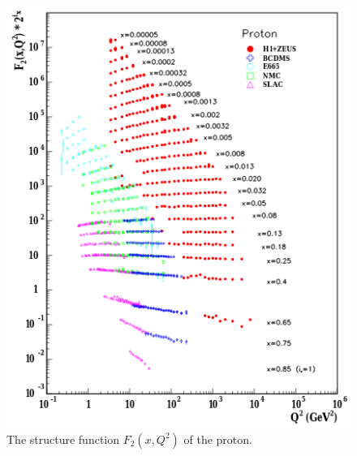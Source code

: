 \begin{figure}[t]
  \includegraphics{proton_f2.png}
  \caption{The structure function $F_2\left(x, Q^2\right)$ of the proton.}
  \label{fig:proton_f2}
\end{figure}


